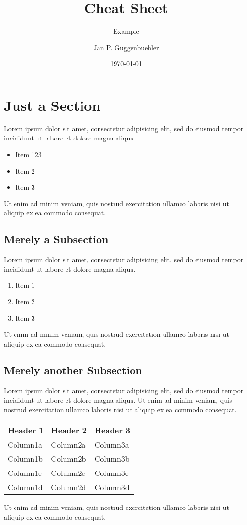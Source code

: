 \documentclass{modernCS}
\begin{document}
\title{Cheat Sheet}
\subtitle{Example}
\author{Jan P. Guggenbuehler}
\date{\today{}}
\maketitle

\section{Just a Section}
Lorem ipsum dolor sit amet, consectetur adipisicing elit, sed do eiusmod
tempor incididunt ut labore et dolore magna aliqua.
\begin{itemize}
	\item Item 123
	\item Item 2
	\item Item 3
\end{itemize}
Ut enim ad minim veniam,
quis nostrud exercitation ullamco laboris nisi ut aliquip ex ea commodo
consequat.

\subsection{Merely a Subsection}
Lorem ipsum dolor sit amet, consectetur adipisicing elit, sed do eiusmod
tempor incididunt ut labore et dolore magna aliqua.
\begin{enumerate}
	\item Item 1
	\item Item 2
	\item Item 3
\end{enumerate}
Ut enim ad minim veniam,
quis nostrud exercitation ullamco laboris nisi ut aliquip ex ea commodo
consequat.

\subsection{Merely another Subsection}
Lorem ipsum dolor sit amet, consectetur adipisicing elit, sed do eiusmod
tempor incididunt ut labore et dolore magna aliqua. Ut enim ad minim veniam, quis nostrud exercitation ullamco laboris nisi ut aliquip ex ea commodo consequat.
\begin{center}
\begin{tabular}{lll}
\toprule
Header 1 & Header 2 & Header 3 \\
\midrule
Column1a & Column2a & Column3a \\
Column1b & Column2b & Column3b \\
Column1c & Column2c & Column3c \\
Column1d & Column2d & Column3d \\
\bottomrule
\end{tabular}
\end{center}
Ut enim ad minim veniam,
quis nostrud exercitation ullamco laboris nisi ut aliquip ex ea commodo
consequat.
\end{document}
